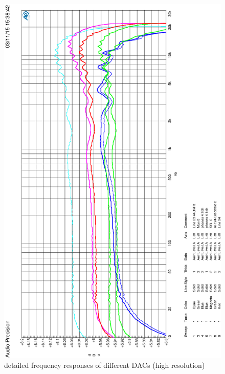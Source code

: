\documentclass[11pt]{report}
\begin{document}
\begin{appendix}
\begin{figure}[htbp]
\begin{center}
\includegraphics[width=14cm,keepaspectratio=true]{HQDaWandlerVergleich}
\caption{detailed frequency responses of different DACs (high resolution)}
\label{Abb.:1}
\end{center}
\end{figure}


\end{appendix}
\end{document}
